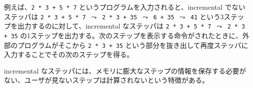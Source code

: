 例えば、\texttt{2 * 3 + 5 * 7} というプログラムを入力されると、incremental でないステッパは \texttt{2 * 3 + 5 * 7 $\leadsto$ 2 * 3 + 35 $\leadsto$ 6 + 35 $\leadsto$ 41} という3ステップを出力するのに対して、incremental なステッパは \texttt{2 * 3 + 5 * 7 $\leadsto$ 2 * 3 + 35} の1ステップを出力する。次のステップを表示する命令がされたときに、外部のプログラムがそこから \texttt{2 * 3 + 35} という部分を抜き出して再度ステッパに入力することでその次のステップを得る。

incremental なステッパには、メモリに膨大なステップの情報を保存する必要がない、ユーザが見ないステップは計算されないという特徴がある。

